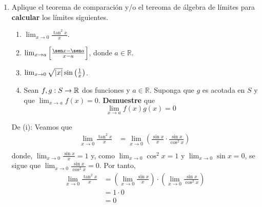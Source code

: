 \documentclass[12pt]{article}
\begin{document}
\begin{enumerate}
    \item Aplique el teorema de comparación y/o el tereoma de álgebra de límites para \textbf{calcular} los límites siguientes.
    \begin{enumerate}
        \item $\lim_{x\rightarrow0}\frac{\tan^2x}{x}$.
        \item $\lim_{x\rightarrow a}\left[\frac{\sen x-\sen a}{x-a} \right]$, donde $a\in\mathbb{R}$.
        \item $\lim_{x\rightarrow0}\sqrt{\left| x \right|}\sin\left(\frac{1}{x}\right)$.
        \item Sean $f,g:S\rightarrow\mathbb{R}$ dos funciones y $a\in\mathbb{R}$. Suponga que $g$ es acotada en $S$ y que $\lim_{x\rightarrow a}f(x)=0$. \textbf{Demuestre} que
        \begin{equation*}
            \lim_{x\rightarrow a}f(x)g(x)=0
        \end{equation*}
    \end{enumerate}

    \begin{sol}
        De (i): Veamos que
        \begin{equation*}
            \begin{split}
                \lim_{x\rightarrow0}\frac{\tan^2x}{x}&=\lim_{x\rightarrow0}\left(\frac{\sin x}{x}\cdot\frac{\sin x}{\cos^2 x}\right) \\
            \end{split}
        \end{equation*}
        donde, $\lim_{x\rightarrow0}\frac{\sin x}{x}=1$ y, como $\lim_{x\rightarrow0}\cos^2 x=1$ y $\lim_{x\rightarrow0}\sin x=0$, se sigue que $\lim_{x\rightarrow0}\frac{\sin x}{\cos^2 x}=0$. Por tanto,
        \begin{equation*}
            \begin{split}
                \lim_{x\rightarrow0}\frac{\tan^2x}{x}&=\left(\lim_{x\rightarrow0}\frac{\sin x}{x}\right)\cdot\left(\lim_{x\rightarrow0}\frac{\sin x}{\cos^2 x}\right)\\
                &=1\cdot 0\\
                &=0\\
            \end{split}
        \end{equation*}


\end{sol}
\end{enumerate}
\end{document}
